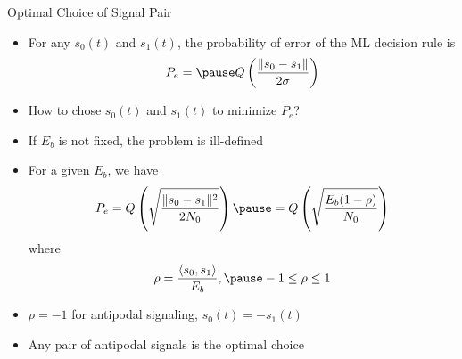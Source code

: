 \documentclass[t]{beamer}
\begin{document}
\begin{frame}{Optimal Choice of Signal Pair}
  \footnotesize
  \begin{itemize}
    \item \pause For any $s_0(t)$ and $s_1(t)$, the probability of error of the ML decision rule is
      \begin{eqnarray*}
        P_e = \pause Q\left(\frac{\lVert s_0 - s_1 \rVert}{2\sigma} \right)
      \end{eqnarray*}
    \item \pause How to chose $s_0(t)$ and $s_1(t)$ to minimize $P_e$?
    \item \pause If $E_b$ is not fixed, the problem is ill-defined
    \item \pause For a given $E_b$, we have
      \begin{eqnarray*}
        P_e = Q\left(\sqrt{\frac{\lVert s_0 - s_1 \rVert^2}{2N_0}} \right) \pause = Q\left(\sqrt{\frac{E_b(1-\rho)}{N_0}} \right) 
      \end{eqnarray*}
      where
      \begin{eqnarray*}
        \rho = \frac{\langle s_0, s_1 \rangle}{E_b}, \pause -1 \leq \rho \leq 1
      \end{eqnarray*}
    \item \pause $\rho = -1$ for antipodal signaling, $s_0(t) = -s_1(t)$
    \item \pause \alert{Any pair of antipodal signals is the optimal choice}
  \end{itemize}
  \normalsize
\end{frame}
\end{document}
